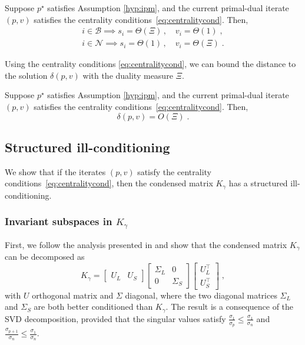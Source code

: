 \begin{proposition}
  \label{prop:cond:boundslack}
  Suppose $p^\star$ satisfies Assumption \ref{hyp:ipm},
  and the current primal-dual iterate $(p, v)$ satisfies the centrality
  conditions~\eqref{eq:centralitycond}. Then,
  \begin{subequations}
    \begin{align}
      i \in \mathcal{B} \implies s_i = \Theta(\Xi) \, , \quad v_i = \Theta(1) \;, \\
      i \in \mathcal{N} \implies s_i = \Theta(1) \, , \quad v_i = \Theta(\Xi) \; .
    \end{align}
  \end{subequations}
\end{proposition}
Using the centrality conditions \eqref{eq:centralitycond}, we can bound
the distance to the solution $\delta(p, v)$ with the duality measure $\Xi$.
\begin{theorem}
  Suppose $p^\star$ satisfies Assumption \ref{hyp:ipm},
  and the current primal-dual iterate $(p, v)$ satisfies the centrality
  conditions~\eqref{eq:centralitycond}. Then,
  \begin{equation}
    \delta(p, v) = O(\Xi) \; .
  \end{equation}
\end{theorem}

\subsection{Structured ill-conditioning}
We show that if the iterates $(p, v)$ satisfy
the centrality conditions~\eqref{eq:centralitycond}, then the
condensed matrix $K_\gamma$ has a structured ill-conditioning.

\subsubsection{Invariant subspaces in $K_\gamma$}
First, we follow the analysis presented in \cite{wright1998ill}
and show that the condensed matrix $K_\gamma$ can be decomposed as
\begin{equation}
  \label{eq:cond:svd}
  K_\gamma = \begin{bmatrix} U_L & U_S \end{bmatrix}
  \begin{bmatrix}
    \Sigma_L & 0 \\ 0 & \Sigma_S
  \end{bmatrix}
  \begin{bmatrix}
    U_L^\top \\ U_S^\top
  \end{bmatrix}
  \; ,
\end{equation}
with $U$ orthogonal matrix and $\Sigma$ diagonal, where
the two diagonal matrices $\Sigma_L$ and $\Sigma_S$ are both better conditioned than $K_\gamma$.
The result is a consequence of the SVD decomposition,
provided that the singular values satisfy $\frac{\sigma_1}{\sigma_{p}} \leq \frac{\sigma_1}{\sigma_n}$
and $\frac{\sigma_{p+1}}{\sigma_{n}} \leq \frac{\sigma_1}{\sigma_n}$.

